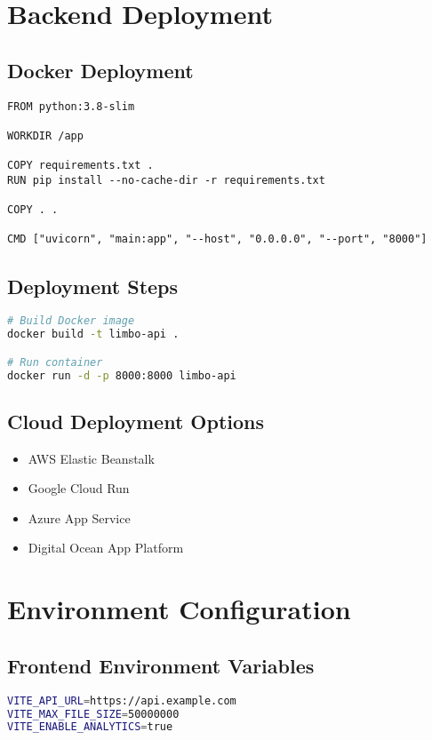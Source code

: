 \section{Backend Deployment}
\subsection{Docker Deployment}
\begin{tcolorbox}[title=Dockerfile]
\begin{lstlisting}[language=docker]
FROM python:3.8-slim

WORKDIR /app

COPY requirements.txt .
RUN pip install --no-cache-dir -r requirements.txt

COPY . .

CMD ["uvicorn", "main:app", "--host", "0.0.0.0", "--port", "8000"]
\end{lstlisting}
\end{tcolorbox}

\subsection{Deployment Steps}
\begin{lstlisting}[language=bash]
# Build Docker image
docker build -t limbo-api .

# Run container
docker run -d -p 8000:8000 limbo-api
\end{lstlisting}

\subsection{Cloud Deployment Options}
\begin{itemize}
    \item AWS Elastic Beanstalk
    \item Google Cloud Run
    \item Azure App Service
    \item Digital Ocean App Platform
\end{itemize}

\section{Environment Configuration}
\subsection{Frontend Environment Variables}
\begin{lstlisting}[language=bash]
VITE_API_URL=https://api.example.com
VITE_MAX_FILE_SIZE=50000000
VITE_ENABLE_ANALYTICS=true
\end{lstlisting}

